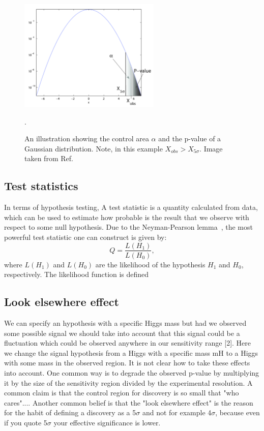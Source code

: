 \begin{figure}[htbp]
    \centering
    \includegraphics[width=0.6\textwidth]{theory/plots/pvalue.png}
    \caption{An illustration showing the control area $\alpha$ and the p-value of a Gaussian distribution. Note, in this 
    example $X_{obs} > X_{5\sigma}$. Image taken from Ref.\cite{Stats-for-pedestrian}}.
    \label{fig:stats:pvalue}
\end{figure}









\subsection{Test statistics}
In terms of hypothesis testing, 
A test statistic is a quantity calculated from data,
which can be used to estimate how probable is the result 
that we observe with respect to some null hypothesis.
Due to the Neyman-Pearson lemma~\cite{Neyman-Pearson}, the most powerful test statistic
one can construct is given by:
\[
Q  = \frac{L(H_1)}{L(H_0)},
\]
where $L(H_1)$ and $L(H_0)$ are the likelihood of the hypothesis $H_1$ and $H_0$, respectively.
The likelihood function is defined 

\subsection{Look elsewhere effect}
We can specify an hypothesis with a specific Higgs mass but had we observed some possible signal
we should take into account that this signal could be a fluctuation which could be observed anywhere in
our sensitivity range [2]. Here we change the signal hypothesis from a Higgs with a specific mass mH to
a Higgs with some mass in the observed region. It is not clear how to take these effects into account. One
common way is to degrade the observed p-value by multiplying it by the size of the sensitivity region
divided by the experimental resolution. A common claim is that the control region for discovery is so
small that "who cares".... Another common belief is that the "look elsewhere effect" is the reason for the
habit of defining a discovery as a 5$\sigma$ and not for example 4$\sigma$, because even if you quote 5$\sigma$ your effective
significance is lower.

